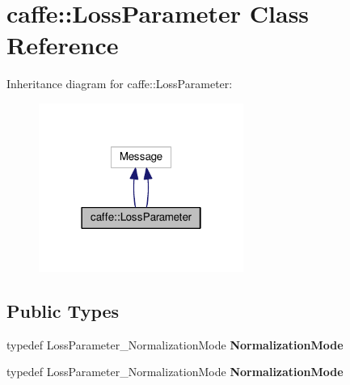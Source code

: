 \hypertarget{classcaffe_1_1_loss_parameter}{}\section{caffe\+:\+:Loss\+Parameter Class Reference}
\label{classcaffe_1_1_loss_parameter}


Inheritance diagram for caffe\+:\+:Loss\+Parameter\+:
\nopagebreak
\begin{figure}[H]
\begin{center}
\leavevmode
\includegraphics[width=190pt]{classcaffe_1_1_loss_parameter__inherit__graph}
\end{center}
\end{figure}
\subsection*{Public Types}
\begin{DoxyCompactItemize}
\item 
\mbox{\label{classcaffe_1_1_loss_parameter_ab54da894705cf436be7475e21509b803}} 
typedef Loss\+Parameter\+\_\+\+Normalization\+Mode {\bfseries Normalization\+Mode}
\item 
\mbox{\label{classcaffe_1_1_loss_parameter_ab54da894705cf436be7475e21509b803}} 
typedef Loss\+Parameter\+\_\+\+Normalization\+Mode {\bfseries Normalization\+Mode}
\end{DoxyCompactItemize}
